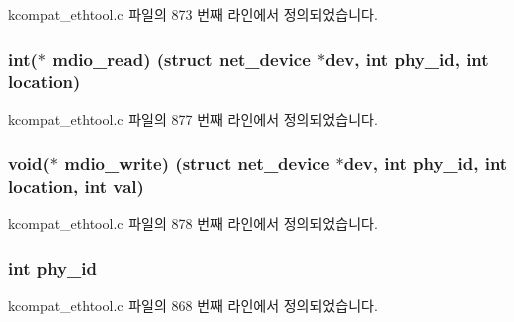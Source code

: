 kcompat\+\_\+ethtool.\+c 파일의 873 번째 라인에서 정의되었습니다.

\subsubsection[{\texorpdfstring{mdio\+\_\+read}{mdio_read}}]{\setlength{\rightskip}{0pt plus 5cm}int($\ast$ mdio\+\_\+read) (struct net\+\_\+device $\ast${\bf dev}, int {\bf phy\+\_\+id}, int location)}\hypertarget{struct__kc__mii__if__info_a70c302608dc8bf60598bc3ffd5180cf4}{}\label{struct__kc__mii__if__info_a70c302608dc8bf60598bc3ffd5180cf4}


kcompat\+\_\+ethtool.\+c 파일의 877 번째 라인에서 정의되었습니다.

\subsubsection[{\texorpdfstring{mdio\+\_\+write}{mdio_write}}]{\setlength{\rightskip}{0pt plus 5cm}void($\ast$ mdio\+\_\+write) (struct net\+\_\+device $\ast${\bf dev}, int {\bf phy\+\_\+id}, int location, int val)}\hypertarget{struct__kc__mii__if__info_ab5c763f19125b020077d0ff496dbc635}{}\label{struct__kc__mii__if__info_ab5c763f19125b020077d0ff496dbc635}


kcompat\+\_\+ethtool.\+c 파일의 878 번째 라인에서 정의되었습니다.

\subsubsection[{\texorpdfstring{phy\+\_\+id}{phy_id}}]{\setlength{\rightskip}{0pt plus 5cm}int phy\+\_\+id}\hypertarget{struct__kc__mii__if__info_a34859205e0eb74ee40d1168c78244146}{}\label{struct__kc__mii__if__info_a34859205e0eb74ee40d1168c78244146}


kcompat\+\_\+ethtool.\+c 파일의 868 번째 라인에서 정의되었습니다.


